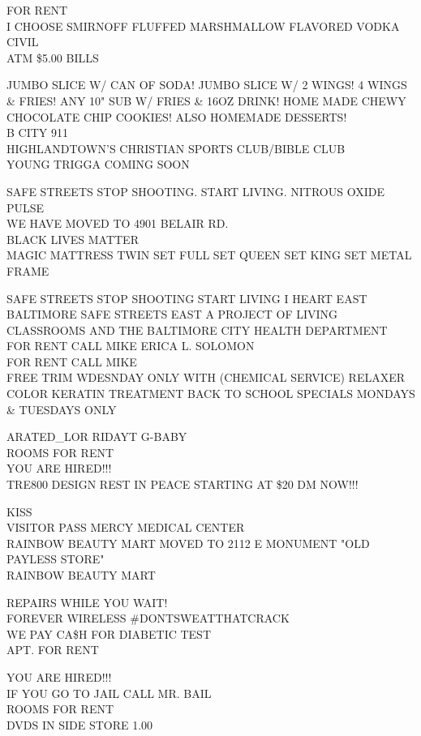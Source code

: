 \documentclass[10pt,letterpaper]{article}
\begin{document}
FOR RENT\\
I CHOOSE SMIRNOFF FLUFFED MARSHMALLOW FLAVORED VODKA\\
CIVIL\\
ATM \$5.00 BILLS

JUMBO SLICE W/ CAN OF SODA! JUMBO SLICE W/ 2 WINGS!    4 WINGS \& FRIES!  ANY 10" SUB W/ FRIES \& 16OZ DRINK!  HOME MADE CHEWY CHOCOLATE CHIP COOKIES!  ALSO HOMEMADE DESSERTS!\\
B CITY 911\\
HIGHLANDTOWN'S CHRISTIAN SPORTS CLUB/BIBLE CLUB\\
YOUNG TRIGGA COMING SOON

SAFE STREETS STOP SHOOTING. START LIVING.  NITROUS OXIDE PULSE\\
WE HAVE MOVED TO 4901 BELAIR RD.\\
BLACK LIVES MATTER\\
MAGIC MATTRESS TWIN SET FULL SET QUEEN SET KING SET METAL FRAME

SAFE STREETS STOP SHOOTING START LIVING I HEART EAST BALTIMORE SAFE STREETS EAST A PROJECT OF LIVING CLASSROOMS AND THE BALTIMORE CITY HEALTH DEPARTMENT\\
FOR RENT CALL MIKE ERICA L. SOLOMON\\
FOR RENT CALL MIKE\\
FREE TRIM WDESNDAY ONLY WITH (CHEMICAL SERVICE) RELAXER COLOR KERATIN TREATMENT BACK TO SCHOOL SPECIALS MONDAYS \& TUESDAYS ONLY

ARATED\_LOR RIDAYT G{-}BABY\\
ROOMS FOR RENT\\
YOU ARE HIRED!!!\\
TRE800 DESIGN REST IN PEACE STARTING AT \$20 DM NOW!!!

KISS\\
VISITOR PASS MERCY MEDICAL CENTER\\
RAINBOW BEAUTY MART MOVED TO 2112 E MONUMENT "OLD PAYLESS STORE"\\
RAINBOW BEAUTY MART

REPAIRS WHILE YOU WAIT!\\
FOREVER WIRELESS \#DONTSWEATTHATCRACK\\
WE PAY CA\$H FOR DIABETIC TEST\\
APT. FOR RENT

YOU ARE HIRED!!!\\
IF YOU GO TO JAIL CALL MR. BAIL\\
ROOMS FOR RENT\\
DVDS IN SIDE STORE 1.00
\end{document}
